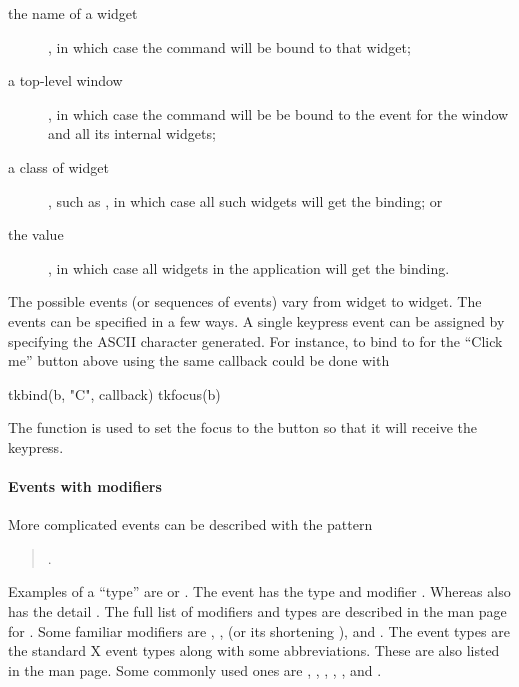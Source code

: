 \begin{description}
\item[the name of a widget], in which case the command will be bound to that widget;
\item[a top-level window], in which case the command will be be bound
  to the event for the window and all its internal widgets;
\item[a class of widget], such as , in which case all
  such widgets will get the binding; or
\item[the value ], in which case all widgets in the
  application will get the binding.
\end{description}
The possible events (or sequences of events) vary from widget to
widget. The events can be specified in a few ways. A single keypress
event can be assigned by specifying the ASCII character
generated. For instance, to bind to  for the ``Click me''
button above using the same callback could be done with
\begin{Schunk}
\begin{Sinput}
  tkbind(b, "C", callback)
  tkfocus(b)
\end{Sinput}
\end{Schunk}
%
The  function is used to set the focus to the button so that it will receive the keypress.

\paragraph{Events with modifiers}
More complicated events can be described with the pattern

\begin{quotation}
.   
\end{quotation}

Examples of a ``type'' are  or
. The event  has the
type  and modifier . Whereas
 also has the detail . The full
list of modifiers and types are described in the man page for
. Some familiar modifiers are , ,
 (or its shortening ),  and
. The event types are the standard X event types along
with some abbreviations. These are also listed in the  man
page. Some commonly used ones are ,
, , ,
, and .

